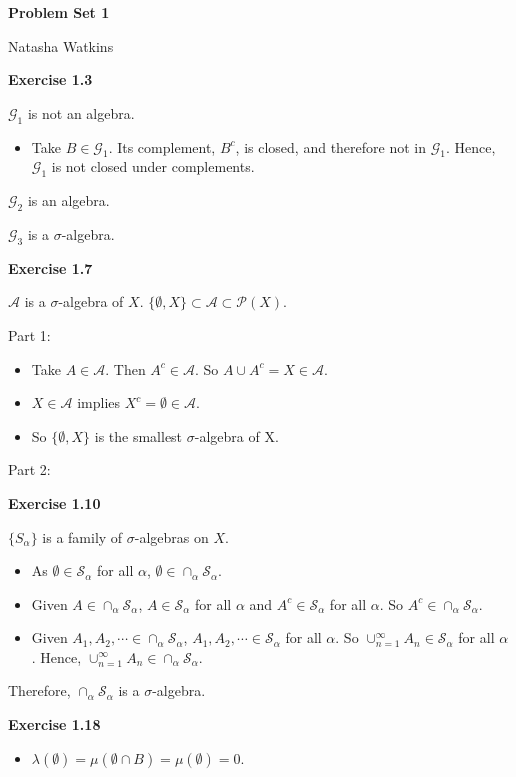 \documentclass[letterpaper,12pt]{article}
\begin{document}
\textbf{\large Problem Set 1}

Natasha Watkins

\vspace{5mm}

\textbf{Exercise 1.3}

$\mathcal{G}_1$ is not an algebra.
\begin{itemize}
  \item Take $B \in \mathcal{G}_1$. Its complement, $B^c$, is closed, and therefore not in $\mathcal{G}_1$. Hence, $\mathcal{G}_1$ is not closed under complements.
\end{itemize}

$\mathcal{G}_2$ is an algebra.

$\mathcal{G}_3$ is a $\sigma$-algebra.


\textbf{Exercise 1.7}

$\mathcal{A}$ is a $\sigma$-algebra of $X$. $\{\emptyset, X\} \subset \mathcal{A} \subset \mathcal{P}(X)$.

Part 1:

\begin{itemize}
  \item Take $A \in \mathcal{A}$. Then $A^c \in \mathcal{A}$. So $A \cup A^c = X \in \mathcal{A}$.
  \item $X \in \mathcal{A}$ implies $X^c = \emptyset \in \mathcal{A}$.
  \item So $\{\emptyset, X\}$ is the smallest $\sigma$-algebra of X.
\end{itemize}

Part 2:

\textbf{Exercise 1.10}

$\{S_\alpha\}$ is a family of $\sigma$-algebras on $X$.

\begin{itemize}
  \item As $\emptyset \in \mathcal{S}_\alpha$ for all $\alpha$,
  $\emptyset \in \cap_\alpha \mathcal{S}_\alpha$.
  \item Given $A \in \cap_\alpha \mathcal{S}_\alpha$, $A \in\mathcal{S}_\alpha$ for all $\alpha$ and $A^c \in \mathcal{S}_\alpha$ for all $\alpha$. So $A^c \in \cap_\alpha \mathcal{S}_\alpha$.
  \item Given $A_1, A_2, \cdots \in \cap_\alpha \mathcal{S}_\alpha$, $A_1, A_2, \cdots \in \mathcal{S}_\alpha$ for all $\alpha$. So $\cup_{n=1}^\infty A_n \in \mathcal{S}_\alpha$ for all $\alpha$. Hence, $\cup_{n=1}^\infty A_n \in \cap_\alpha \mathcal{S}_\alpha$.
\end{itemize}

Therefore, $\cap_\alpha \mathcal{S}_\alpha$ is a $\sigma$-algebra.

\textbf{Exercise 1.18}

\begin{itemize}
  \item $\lambda(\emptyset) = \mu(\emptyset \cap B) = \mu(\emptyset) = 0$.
\end{itemize}
\end{document}
